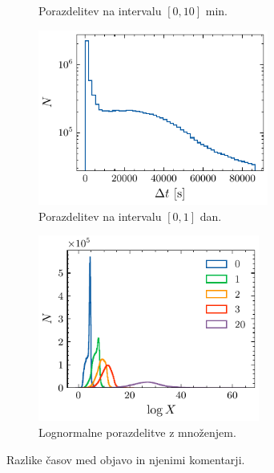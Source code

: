 \documentclass[11pt, oneside]{article}
\theoremstyle{definition}
\begin{document}
\begin{figure}[h!]
\begin{subfigure}[b]{0.49\textwidth}
        \caption{Porazdelitev na intervalu $[0, 10]$ min.}
        \label{fig: ptimes2}
    \end{subfigure}
    \hfill
    \begin{subfigure}[b]{0.49\textwidth}
        \centering
        \includegraphics[width=0.83\textwidth]{reddit_post_activity_1day.pdf}
        \caption{Porazdelitev na intervalu $[0, 1]$ dan.}
        \label{fig: ptimes3}
    \end{subfigure}
    \hfill
    \begin{subfigure}[b]{0.49\textwidth}
        \centering
        \includegraphics[width=0.8\textwidth]{reddit_lognorms.pdf}
        \caption{Lognormalne porazdelitve z množenjem.}
        \label{fig: ptimes4}
    \end{subfigure}
    \caption{Razlike časov med objavo in njenimi komentarji.}
    \label{fig: ptimes}
\end{figure}
\end{document}
